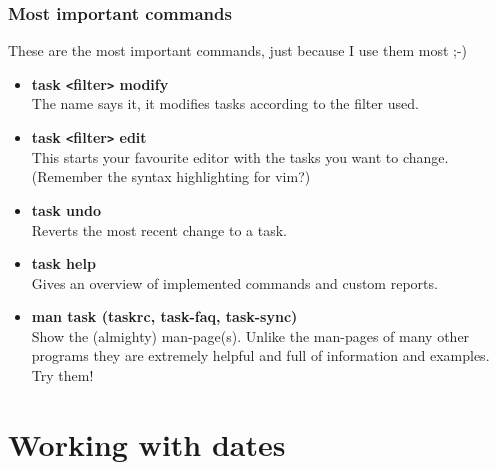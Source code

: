 \documentclass[t,handout]{beamer}
\begin{document}
\begin{frame}[fragile]\frametitle{Most important commands}
    These are the most important commands, just because I use them most ;-)

    \begin{itemize}
        \item \textbf{task {\tt<}filter{\tt>} modify} \\
        The name says it, it modifies tasks according to the filter used. \pause
        \item \textbf{task {\tt<}filter{\tt>} edit} \\
        This starts your favourite editor with the tasks you want to change. \\
        (Remember the syntax highlighting for vim?) \pause
        \item \textbf{task undo} \\
        Reverts the most recent change to a task. \pause
        \item \textbf{task help} \\
        Gives an overview of implemented commands and custom reports. \pause
        \item \textbf{man task (taskrc, task-faq, task-sync)} \\
        Show the (almighty) man-page(s). Unlike the man-pages of many other
        programs they are extremely helpful and full of information and examples.
        Try them!
    \end{itemize}
\end{frame}

\section{Working with dates}
\end{document}
